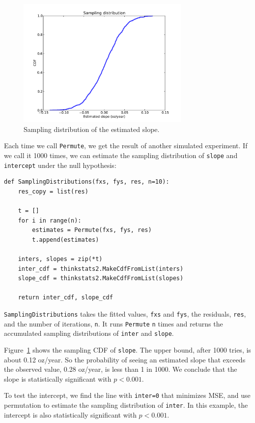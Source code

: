 \documentclass[12pt]{book}
\begin{document}
\begin{figure}
\centerline{\includegraphics[height=2.5in]{figs/regress1.pdf}}
\caption{Sampling distribution of the estimated slope.}
\label{regress1}
\end{figure}

Each time we call {\tt Permute}, we get the result of another simulated
experiment.  If we call it 1000 times, we can estimate the sampling
distribution of {\tt slope} and {\tt intercept} under the null
hypothesis:

\begin{verbatim}
def SamplingDistributions(fxs, fys, res, n=10):
    res_copy = list(res)

    t = []
    for i in range(n):
        estimates = Permute(fxs, fys, res)
        t.append(estimates)

    inters, slopes = zip(*t)
    inter_cdf = thinkstats2.MakeCdfFromList(inters)
    slope_cdf = thinkstats2.MakeCdfFromList(slopes)

    return inter_cdf, slope_cdf
\end{verbatim}

{\tt SamplingDistributions} takes the fitted values, {\tt fxs} and {\tt fys},
the residuals, {\tt res}, and the number of iterations, {\tt n}.
It runs {\tt Permute} {\tt n} times and returns the accumulated
sampling distributions of {\tt inter} and {\tt slope}.

Figure~\ref{regress1} shows the sampling CDF of {\tt slope}.  The
upper bound, after 1000 tries, is about 0.12 oz/year.  So the
probability of seeing an estimated slope that exceeds the observed
value, 0.28 oz/year, is less than 1 in 1000.  We conclude that the
slope is statistically significant with $p < 0.001$.

To test the intercept, we find the line with {\tt inter=0} that
minimizes MSE, and use permutation to estimate the sampling
distribution of {\tt inter}.  In this example, the intercept is also
statistically significant with $p < 0.001$.
\end{document}
